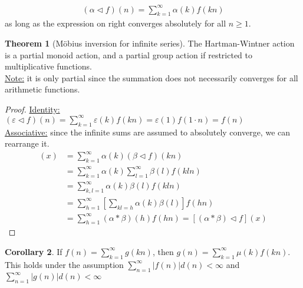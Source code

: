 \documentclass{article}
\theoremstyle{definition}
\newtheorem{theorem}{Theorem}[section]
\newtheorem{corollary}[theorem]{Corollary}
\begin{document}
\begin{shaded}
\begin{align*}
(\alpha \triangleleft f) (n) = \sum_{k = 1}^\infty \alpha(k) f(kn)
\end{align*}
as long as the expression on right converges absolutely for all $n \geq 1$.
\begin{theorem}[Möbius inversion for infinite series]
The Hartman-Wintner action is a partial monoid action, and a partial group action if restricted to multiplicative functions.
\\
\underline{Note:} it is only partial since the summation does not necessarily converges for all arithmetic functions.
\end{theorem}
\begin{proof}
\underline{Identity:} $(\varepsilon \triangleleft f)(n) = \sum_{k = 1}^\infty \varepsilon(k) f \left( kn \right) = \varepsilon(1) f(1 \cdot n) = f(n)$
\\
\underline{Associative:} since the infinite sums are assumed to absolutely converge, we can rearrange it.
\begin{align*}
[\alpha \triangleleft (\beta \triangleleft f)] (x) & = \sum_{k = 1}^\infty \alpha(k) (\beta \triangleleft f)(kn)
\\
& = \sum_{k = 1}^\infty \alpha(k) \sum_{l = 1}^\infty \beta(l) f(kln)
\\
& = \sum_{k, l = 1}^\infty \alpha(k) \beta(l) f(kln)
\\
& = \sum_{h = 1}^\infty \left[ \sum_{kl = h} \alpha(k) \beta(l) \right] f(hn)
\\
& = \sum_{h = 1}^\infty (\alpha*\beta)(h) f(hn) = [(\alpha*\beta) \triangleleft f] (x)
\end{align*}
\end{proof}
\begin{corollary}
If $f(n) = \sum_{k = 1}^\infty g(kn)$, then $g(n) = \sum_{k = 1}^\infty \mu(k) f(kn)$. This holds under the assumption $\sum_{n = 1}^\infty |f(n)| d(n) < \infty$ and $\sum_{n = 1}^\infty |g(n)| d(n) < \infty$
\end{corollary}

\newpage


\end{shaded}
\end{document}
